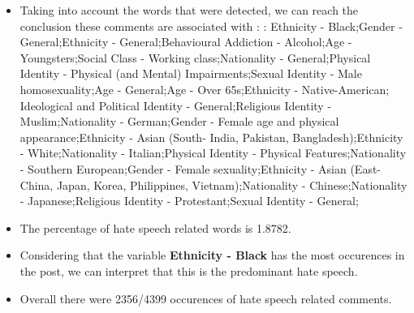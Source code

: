 \documentclass[11pt]{article}
\begin{document}
\begin{itemize}\item Taking into account the words that were detected, we can reach the conclusion these comments are associated with : : Ethnicity - Black;Gender - General;Ethnicity - General;Behavioural Addiction - Alcohol;Age - Youngsters;Social Class - Working class;Nationality - General;Physical Identity - Physical (and Mental) Impairments;Sexual Identity - Male homosexuality;Age - General;Age - Over 65s;Ethnicity - Native-American; Ideological and Political Identity - General;Religious Identity - Muslim;Nationality - German;Gender - Female age and physical appearance;Ethnicity - Asian (South- India, Pakistan, Bangladesh);Ethnicity - White;Nationality - Italian;Physical Identity - Physical Features;Nationality - Southern European;Gender - Female sexuality;Ethnicity - Asian (East- China, Japan, Korea, Philippines, Vietnam);Nationality - Chinese;Nationality - Japanese;Religious Identity - Protestant;Sexual Identity - General;%

\item The percentage of hate speech related words is 1.8782.

\item Considering that the variable \textbf{Ethnicity - Black} has the most occurences in the post, we can interpret that this is the predominant hate speech.

\item Overall there were 2356/4399 occurences of hate speech related comments.\end{itemize}
\end{document}
